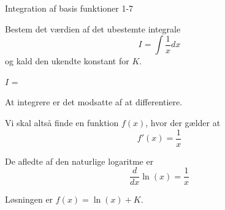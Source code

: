 \documentclass{article}
\begin{document}
\begin{exercise}{Integration af basis funktioner 1-7}

Bestem det værdien af det ubestemte integrale
\[
I = \int \frac{1}{x} dx
\]
og kald den ukendte konstant for $K$.

$I$ = 

\hint
At integrere er det modsatte af at differentiere.

\hint
Vi skal altså finde en funktion $f(x)$, hvor der gælder at
\[
f'(x) = \frac{1}{x}
\]

\hint
De afledte af den naturlige logaritme er
\[
\frac{d}{dx} \ln(x) = \frac{1}{x}
\]


\hint
Løsningen er $f(x) = \ln(x) + K$.

\end{exercise}
\end{document}
